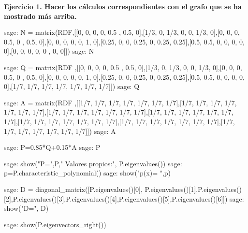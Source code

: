 
\begin{ejer}
    \textbf{Ejercicio 1. Hacer los cálculos correspondientes con el grafo que se ha mostrado más arriba.}
\end{ejer}

\begin{sagecommandline}
    sage: N = matrix(RDF,[[0, 0, 0, 0, 0.5 , 0.5, 0],[1/3, 0, 1/3, 0, 0, 1/3, 0],[0, 0, 0, 0.5, 0 , 0.5, 0],[0, 0, 0, 0, 0, 1, 0],[0.25, 0, 0, 0.25, 0, 0.25, 0.25],[0.5, 0.5, 0, 0, 0, 0, 0],[0, 0, 0, 0, 0 , 0, 0]])
    sage: N
\end{sagecommandline}
    
\begin{sagecommandline}
    sage: Q = matrix(RDF ,[[0, 0, 0, 0, 0.5 , 0.5, 0],[1/3, 0, 1/3, 0, 0, 1/3, 0],[0, 0, 0, 0.5, 0 , 0.5, 0],[0, 0, 0, 0, 0, 1, 0],[0.25, 0, 0, 0.25, 0, 0.25, 0.25],[0.5, 0.5, 0, 0, 0, 0, 0],[1/7, 1/7, 1/7, 1/7, 1/7, 1/7, 1/7]])
    sage: Q
\end{sagecommandline}
    
\begin{sagecommandline}
    sage: A = matrix(RDF ,[[1/7, 1/7, 1/7, 1/7, 1/7, 1/7, 1/7],[1/7, 1/7, 1/7, 1/7, 1/7, 1/7, 1/7],[1/7, 1/7, 1/7, 1/7, 1/7, 1/7, 1/7],[1/7, 1/7, 1/7, 1/7, 1/7, 1/7, 1/7],[1/7, 1/7, 1/7, 1/7, 1/7, 1/7, 1/7],[1/7, 1/7, 1/7, 1/7, 1/7, 1/7, 1/7],[1/7, 1/7, 1/7, 1/7, 1/7, 1/7, 1/7]])
    sage: A
\end{sagecommandline}
    
\begin{sagecommandline}
    sage: P=0.85*Q+0.15*A
    sage: P
\end{sagecommandline}
    
\begin{sagecommandline}
    sage: show("P=",P," Valores propios:", P.eigenvalues())
    sage: p=P.characteristic_polynomial()
    sage: show("p(x)=  ",p)
\end{sagecommandline}
    
    
\begin{sagecommandline}
    sage: D = diagonal_matrix([P.eigenvalues()[0], P.eigenvalues()[1],P.eigenvalues()[2],P.eigenvalues()[3],P.eigenvalues()[4],P.eigenvalues()[5],P.eigenvalues()[6]])
    sage: show("D=", D)
\end{sagecommandline}
    
\begin{sagecommandline}
    sage: show(P.eigenvectors_right())
\end{sagecommandline}
    
